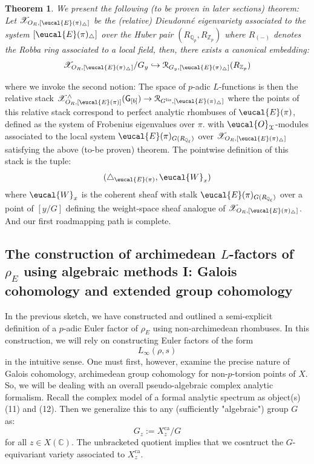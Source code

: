 \documentclass[9pt]{amsart}
\let\texcal\mathcal
\renewcommand{\[}{\begin{equation}}
\renewcommand{\]}{\end{equation}}
\newcommand{\on}{\operatorname}
\theoremstyle{plain}
\newtheorem*{thm*}{Theorem}
\theoremstyle{remark}
\begin{document}
\begin{thm*}
We present the following (to be proven in later sections) theorem: Let $\mathscr{X}_{O_R, [\eucal{E}(\pi)_{\triangle}]}$ be the (relative) Dieudonné eigenvariety associated to the system $[\eucal{E}(\pi)_{\triangle}]$ over the Huber pair $(R_{\mathbb{Q}_p}, R_{\mathbb{Z}_p})$ where $R_{(-)}$ denotes the Robba ring associated to a local field, then, there exists a canonical embedding:
\[\mathscr{X}_{O_R, [\eucal{E}(\pi)_{\triangle}]}/G_y \hookrightarrow \texcal{R}_{G_y, [\eucal{E}(\pi)_{\triangle}]}(R_{\mathbb{Z}_p})\]
\end{thm*}
where we invoke the second notion: The space of $p$-adic $L$-functions is then the relative stack $\mathscr{X}^{\wedge}_{O_R, [\eucal{E}(\pi)]}(\mathsf{G}_{[b]}) \to \texcal{R}_{G^{\on{lis}}, [\eucal{E}(\pi)_{\triangle}]}$ where the points of this relative stack correspond to perfect analytic rhombuses of $\eucal{E}(\pi)$, defined as the system of Frobenius eigenvalues over $\pi$. with $\eucal{O}_{\mathcal{X}}$-modules associated to the local system $\eucal{E}(\pi)_{G(R_{\mathbb{Q}_{\ell}})}$ over $\mathscr{X}_{O_R, [\eucal{E}(\pi)_{\triangle}]}$ satisfying the above (to-be proven) theorem. The pointwise definition of this stack is the tuple:
\[(\triangle_{\eucal{E}(\pi)}, \eucal{W}_x)\]
where $\eucal{W}_x$ is the coherent sheaf with stalk $\eucal{E}(\pi)_{G(R_{\mathbb{Q}_{\ell}})}$ over a point of $[y/G]$ defining the weight-space sheaf analogue of $\mathscr{X}_{O_R, [\eucal{E}(\pi)_{\triangle}]}$.
And our first roadmapping path is complete.
\subsection{The construction of archimedean $L$-factors of $\rho_E$ using algebraic methods I: Galois cohomology and extended group cohomology}
In the previous sketch, we have constructed and outlined a semi-explicit definition of a $p$-adic Euler factor of $\rho_E$ using non-archimedean rhombuses. In this construction, we will rely on constructing Euler factors of the form
\[ L_{\infty}(\rho, s) \]
in the intuitive sense. One must first, however, examine the precise nature of Galois cohomology, archimedean group cohomology for non-$p$-torsion points of $X$. So, we will be dealing with an overall pseudo-algebraic complex analytic formalism. Recall the complex model of a formal analytic spectrum as object(s) (11) and (12). Then we generalize this to any (sufficiently "algebraic") group $G$ as:
\[G_z := X^{\on{ca}}_z/G\]
for all $z \in X(\mathbb{C})$. The unbracketed quotient implies that we cosntruct the $G$-equivariant variety associated to $X^{\on{ca}}_z$.
\end{document}

